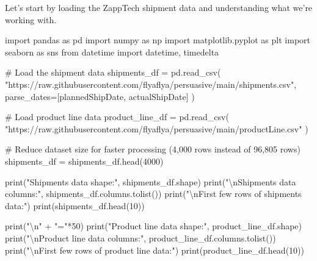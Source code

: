\documentclass[
  letterpaper,
  DIV=11,
  numbers=noendperiod]{scrartcl}
\newenvironment{Shaded}{\begin{snugshade}}{\end{snugshade}}
\newcommand{\BuiltInTok}[1]{\textcolor[rgb]{0.00,0.23,0.31}{#1}}
\newcommand{\CharTok}[1]{\textcolor[rgb]{0.13,0.47,0.30}{#1}}
\newcommand{\CommentTok}[1]{\textcolor[rgb]{0.37,0.37,0.37}{#1}}
\newcommand{\DecValTok}[1]{\textcolor[rgb]{0.68,0.00,0.00}{#1}}
\newcommand{\ImportTok}[1]{\textcolor[rgb]{0.00,0.46,0.62}{#1}}
\newcommand{\NormalTok}[1]{\textcolor[rgb]{0.00,0.23,0.31}{#1}}
\newcommand{\OperatorTok}[1]{\textcolor[rgb]{0.37,0.37,0.37}{#1}}
\newcommand{\StringTok}[1]{\textcolor[rgb]{0.13,0.47,0.30}{#1}}
\begin{document}
Let's start by loading the ZappTech shipment data and understanding what
we're working with.

\label{load-data}
\begin{Shaded}
\begin{Highlighting}[]
\ImportTok{import}\NormalTok{ pandas }\ImportTok{as}\NormalTok{ pd}
\ImportTok{import}\NormalTok{ numpy }\ImportTok{as}\NormalTok{ np}
\ImportTok{import}\NormalTok{ matplotlib.pyplot }\ImportTok{as}\NormalTok{ plt}
\ImportTok{import}\NormalTok{ seaborn }\ImportTok{as}\NormalTok{ sns}
\ImportTok{from}\NormalTok{ datetime }\ImportTok{import}\NormalTok{ datetime, timedelta}

\CommentTok{\# Load the shipment data}
\NormalTok{shipments\_df }\OperatorTok{=}\NormalTok{ pd.read\_csv(}
    \StringTok{"https://raw.githubusercontent.com/flyaflya/persuasive/main/shipments.csv"}\NormalTok{, }
\NormalTok{    parse\_dates}\OperatorTok{=}\NormalTok{[}\StringTok{\textquotesingle{}plannedShipDate\textquotesingle{}}\NormalTok{, }\StringTok{\textquotesingle{}actualShipDate\textquotesingle{}}\NormalTok{]}
\NormalTok{)}

\CommentTok{\# Load product line data}
\NormalTok{product\_line\_df }\OperatorTok{=}\NormalTok{ pd.read\_csv(}
    \StringTok{"https://raw.githubusercontent.com/flyaflya/persuasive/main/productLine.csv"}
\NormalTok{)}

\CommentTok{\# Reduce dataset size for faster processing (4,000 rows instead of 96,805 rows)}
\NormalTok{shipments\_df }\OperatorTok{=}\NormalTok{ shipments\_df.head(}\DecValTok{4000}\NormalTok{)}

\BuiltInTok{print}\NormalTok{(}\StringTok{"Shipments data shape:"}\NormalTok{, shipments\_df.shape)}
\BuiltInTok{print}\NormalTok{(}\StringTok{"}\CharTok{\textbackslash{}n}\StringTok{Shipments data columns:"}\NormalTok{, shipments\_df.columns.tolist())}
\BuiltInTok{print}\NormalTok{(}\StringTok{"}\CharTok{\textbackslash{}n}\StringTok{First few rows of shipments data:"}\NormalTok{)}
\BuiltInTok{print}\NormalTok{(shipments\_df.head(}\DecValTok{10}\NormalTok{))}

\BuiltInTok{print}\NormalTok{(}\StringTok{"}\CharTok{\textbackslash{}n}\StringTok{"} \OperatorTok{+} \StringTok{"="}\OperatorTok{*}\DecValTok{50}\NormalTok{)}
\BuiltInTok{print}\NormalTok{(}\StringTok{"Product line data shape:"}\NormalTok{, product\_line\_df.shape)}
\BuiltInTok{print}\NormalTok{(}\StringTok{"}\CharTok{\textbackslash{}n}\StringTok{Product line data columns:"}\NormalTok{, product\_line\_df.columns.tolist())}
\BuiltInTok{print}\NormalTok{(}\StringTok{"}\CharTok{\textbackslash{}n}\StringTok{First few rows of product line data:"}\NormalTok{)}
\BuiltInTok{print}\NormalTok{(product\_line\_df.head(}\DecValTok{10}\NormalTok{))}
\end{Highlighting}
\end{Shaded}
\end{document}
